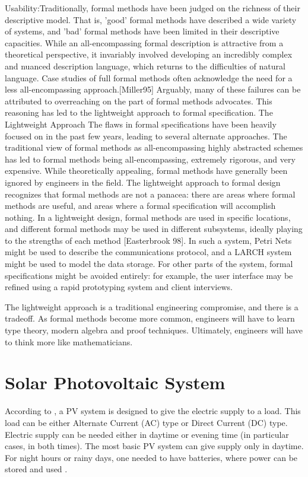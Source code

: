 Usability:Traditionally, formal methods have been judged on the richness of their descriptive model. That is, 'good' formal methods have described a wide variety of systems, and 'bad' formal methods have been limited in their descriptive capacities. While an all-encompassing formal description is attractive from a theoretical perspective, it invariably involved developing an incredibly complex and nuanced description language, which returns to the difficulties of natural language. Case studies of full formal methods often acknowledge the need for a less all-encompassing approach.[Miller95]
Arguably, many of these failures can be attributed to overreaching on the part of formal methods advocates. This reasoning has led to the lightweight approach to formal specification.
The Lightweight Approach
The flaws in formal specifications have been heavily focused on in the past few years, leading to several alternate approaches. The traditional view of formal methods as all-encompassing highly abstracted schemes has led to formal methods being all-encompassing, extremely rigorous, and very expensive. While theoretically appealing, formal methods have generally been ignored by engineers in the field.
The lightweight approach to formal design recognizes that formal methods are not a panacea: there are areas where formal methods are useful, and areas where a formal specification will accomplish nothing. In a lightweight design, formal methods are used in specific locations, and different formal methods may be used in different subsystems, ideally playing to the strengths of each method [Easterbrook 98]. In such a system, Petri Nets might be used to describe the communications protocol, and a LARCH system might be used to model the data storage. For other parts of the system, formal specifications might be avoided entirely: for example, the user interface may be refined using a rapid prototyping system and client interviews.

The lightweight approach is a traditional engineering compromise, and there is a tradeoff. As formal methods become more common, engineers will have to learn type theory, modern algebra and proof techniques. Ultimately, engineers will have to think more like mathematicians.

\section{Solar Photovoltaic System }
According to \cite{Roy}, a PV system is designed to give the electric supply to a load. This load can be either Alternate Current (AC) type or Direct Current (DC) type. Electric supply can be needed either in daytime or evening time (in particular cases, in both times). The most basic PV system can give supply only in daytime.  For night hours or rainy days, one needed to have batteries, where power can be stored and used \cite{Gules}. 

